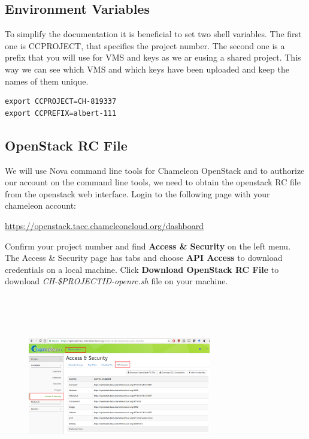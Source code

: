 \subsection{Environment Variables}

To simplify the documentation it is beneficial to set two shell
variables. The first one is CCPROJECT, that specifies the project
number.
The second one is a prefix that you will use for VMS and keys as we ar
eusing a shared project. This way we can see which VMS and which keys
have been uploaded and keep the names of them unique.

\begin{lstlisting}
export CCPROJECT=CH-819337
export CCPREFIX=albert-111
\end{lstlisting}



\subsection{OpenStack RC File}

We will use Nova command line tools for Chameleon OpenStack and to
authorize our account on the command line tools, we need to obtain the
openstack RC file from the openstack web interface. Login to the
following page with your chameleon account:


\url{https://openstack.tacc.chameleoncloud.org/dashboard}

Confirm your project number and find \textbf{Access \& Security} on
the left menu.  The Access \& Security page has tabs and choose
\textbf{API Access} to download credentials on a local machine. Click
\textbf{Download OpenStack RC File} to download
\textit{CH-\$PROJECTID-openrc.sh} file on your machine.


  \begin{figure}[!htbp]
    \includegraphics[width=8cm,height=8cm]{section/cloud/chameleon/images/openstack-chameleon-openrc.png}
    \centering
  \end{figure}

